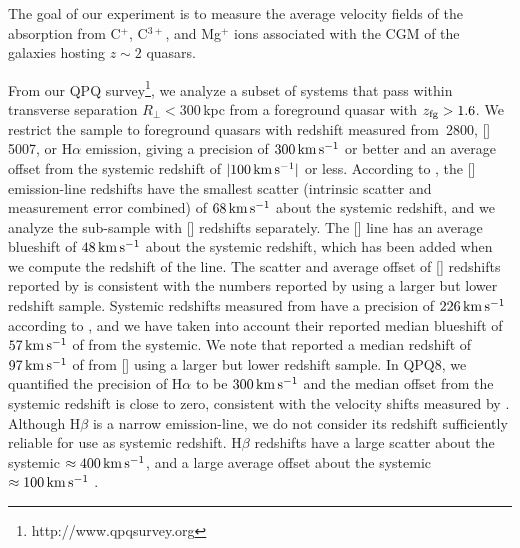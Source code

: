 \documentclass[iop]{emulateapj}
\begin{document}
The goal of our experiment is to measure the average velocity fields of the absorption from C$^+$, 
C$^{3+}$, and Mg$^+$ ions associated with the CGM of the galaxies hosting $z\sim 2$ quasars. 

From our QPQ survey\footnote{http://www.qpqsurvey.org}, we analyze a subset of systems that 
pass within transverse separation $R_\perp<300$\,kpc from a foreground quasar with 
$z_{\rm fg} > 1.6$. We restrict the sample to foreground quasars with redshift measured from 
\,2800, []\,5007, or H$\alpha$ emission, giving a precision of 
$300\,{\rm km\,s^{-1}}$ or better and an average offset from the systemic redshift of 
$|100\,{\rm km\,s^{-1}}|$ or less. According to \cite{Shen+16}, the [] emission-line 
redshifts have the smallest scatter (intrinsic scatter and measurement error combined) of 
$68\,{\rm km\,s^{-1}}$ about the systemic redshift, and we analyze the sub-sample with 
[] redshifts separately. The [] line has an average blueshift of 
$48\,{\rm km\,s^{-1}}$ about the systemic redshift, which has been added when we compute the 
redshift of the line. The scatter and average offset of [] redshifts reported by 
\cite{Shen+16} is consistent with the numbers reported by \cite{Boroson05} using a larger but 
lower redshift sample. Systemic redshifts measured from  have a precision of 
$226\,{\rm km\,s^{-1}}$ according to \cite{Shen+16}, and we have taken into account their 
reported median blueshift of $57\,{\rm km\,s^{-1}}$ of  from the systemic. We note that 
\cite{Richards+02} reported a median redshift of $97\,{\rm km\,s^{-1}}$ of  from 
[] using a larger but lower redshift sample. In QPQ8, we quantified 
the precision of H$\alpha$ to be $300\,{\rm km\,s^{-1}}$ and the median offset from the systemic 
redshift is close to zero, consistent with the velocity shifts measured by \cite{Shen+11}. 
Although H$\beta$ is a narrow emission-line, we do not consider its redshift sufficiently reliable 
for use as systemic redshift. H$\beta$ redshifts have a large scatter about the systemic 
$\approx400\,{\rm km\,s^{-1}}$, and a large average offset about the systemic 
$\approx100\,{\rm km\,s^{-1}}$ \citep[][QPQ8]{Shen+16}.
\end{document}
